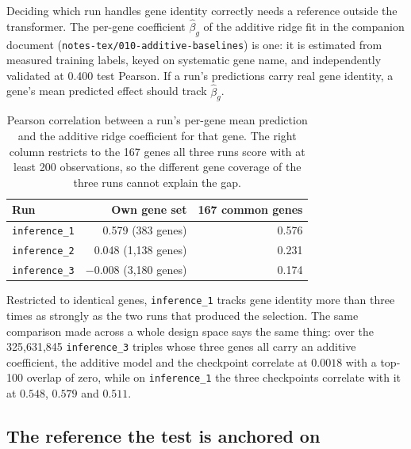 Deciding which run handles gene identity correctly needs a reference outside the
transformer. The per-gene coefficient $\hat{\beta}_g$ of the additive ridge fit
in the companion document (\texttt{notes-tex/010-additive-baselines}) is one: it
is estimated from measured training labels, keyed on systematic gene name, and
independently validated at 0.400 test Pearson. If a run's predictions carry
real gene identity, a gene's mean predicted effect should track
$\hat{\beta}_g$.

\begin{table}[htbp]
\centering
\begin{tabular}{lrr}
\hline
Run & Own gene set & 167 common genes \\
\hline
\texttt{inference\_1} & 0.579 (383 genes) & 0.576 \\
\texttt{inference\_2} & 0.048 (1{,}138 genes) & 0.231 \\
\texttt{inference\_3} & $-0.008$ (3{,}180 genes) & 0.174 \\
\hline
\end{tabular}
\caption{Pearson correlation between a run's per-gene mean prediction and the
additive ridge coefficient for that gene. The right column restricts to the 167
genes all three runs score with at least 200 observations, so the different gene
coverage of the three runs cannot explain the gap.}
\label{tab:anchor}
\end{table}

Restricted to identical genes, \texttt{inference\_1} tracks gene identity more
than three times as strongly as the two runs that produced the selection. The
same comparison made across a whole design space says the same thing: over the
325{,}631{,}845 \texttt{inference\_3} triples whose three genes all carry an
additive coefficient, the additive model and the checkpoint correlate at
$0.0018$ with a top-100 overlap of zero, while on \texttt{inference\_1} the three
checkpoints correlate with it at $0.548$, $0.579$ and $0.511$.


\subsection{The reference the test is anchored on}

